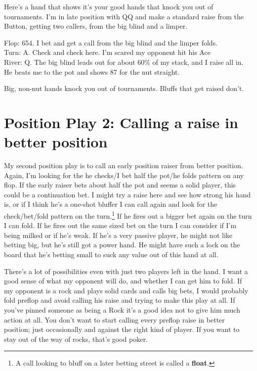 
Here's a hand that shows it's your good hands that knock you out of tournaments.
I'm in late position with QQ and make a standard raise from the Button,
getting two callers, from the big blind and a limper.

Flop: 654. I bet and get a call from the big blind and the limper folds. \\
Turn: A. Check and check here. I'm scared my opponent hit his Ace \\
River: Q.  The big blind leads out for about 60\% of my stack, and I raise all
in. He beats me to the pot and shows 87 for the nut straight.

Big, non-nut hands knock you out of tournaments. Bluffs that get
raised don't.

\section{Position Play 2: Calling a raise in better position}

My second position play is to call an early position raiser from better
position. Again, I'm looking for the he checks/I bet half the pot/he folds
pattern on any flop. If the early raiser bets about half the
pot and seems a solid player, this could be a continuation bet. I might
try a raise here and see how strong his hand is, or if I think he's a
one-shot bluffer I can call again and look for the check/bet/fold
pattern on the turn.\footnote{A call looking to bluff on a later betting
street is called a \textbf{float}.} If he fires out a bigger bet again
on the turn I
can fold. If he fires out the same sized bet on the turn I can consider if
I'm being milked or if he's weak. If he's a very passive player,
he might not like betting big, but he's still got a power hand. He
might have such a lock on the board that he's betting small to suck
any value out of this hand at all.

There's a lot of possibilities even with just two players left in the hand.
I want a good sense of what my opponent will do, and whether I can
get him to fold. If my opponent is a rock and plays solid cards
and calls big bets, I would probably fold preflop and avoid calling his raise
and trying to make this play at all. If you've pinned someone as being
a Rock it's a good idea not to give him much action at all. You don't
want to start calling every preflop raise in better position;
just occasionally and against the right kind of player. If you want to
stay out of the way of rocks, that's good poker.

